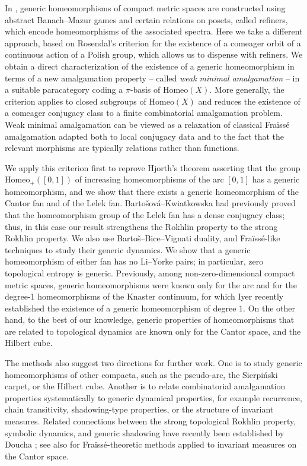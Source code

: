 \documentclass[12pt]{amsart}
\numberwithin{equation}{section}
\theoremstyle{plain}
\theoremstyle{definition}
\newcommand \Homeo{ \mbox{Homeo}}
\newcommand \fra{Fra\"{i}ss\'{e}}
\begin{document}
In \cite{BiMa}, generic homeomorphisms of compact metric spaces are constructed using abstract Banach--Mazur games and certain relations on posets, called refiners, which encode homeomorphisms of the associated spectra. Here we take a different approach, based on Rosendal's criterion for the existence of a comeager orbit of a continuous action of a Polish group, which allows us to dispense with refiners. We obtain a direct characterization of the existence of a generic homeomorphism in terms of a new amalgamation property -- called \emph{weak minimal amalgamation} -- in a suitable paracategory coding a $\pi$-basis of $\Homeo(X)$. More generally, the criterion applies to closed subgroups of $\Homeo(X)$ and reduces the existence of a comeager conjugacy class to a finite combinatorial amalgamation problem. Weak minimal amalgamation can be viewed as a relaxation of classical Fra\"iss\'e amalgamation adapted both to local conjugacy data and to the fact that the relevant morphisms are typically relations rather than functions.


We apply this criterion first to reprove Hjorth's theorem \cite{Hj} asserting that the group $\Homeo_+([0,1])$ of increasing homeomorphisms of the arc $[0,1]$ has a generic homeomorphism, and we show that there exists a generic homeomorphism of the Cantor fan and of the Lelek fan. Barto\v{s}ov\'a--Kwiatkowska \cite{BaKw} had previously proved that the homeomorphism group of the Lelek fan has a dense conjugacy class; thus, in this case our result strengthens the Rokhlin property to the
strong Rokhlin property. We also use Barto\v{s}--Bice--Vignati duality, and Fra\"iss\'e-like techniques to study their generic dynamics.  We show that a generic homeomorphism of either fan has no Li--Yorke pairs; in particular, zero topological entropy is generic. Previously, among non-zero-dimensional compact metric spaces, generic homeomorphisms were known only for the arc and for the degree-1 homeomorphisms of the Knaster continuum, for which Iyer \cite{Iy} recently established the existence of a generic homeomorphism of degree $1$. On the other hand, to the best of our knowledge, generic properties of homeomorphisms that are related to topological dynamics are known only for the Cantor space, and the Hilbert cube.  

The methods also suggest two directions for further work. One is to study generic homeomorphisms of other compacta, such as the pseudo-arc, the Sierpiński carpet, or the Hilbert cube. Another is to relate combinatorial amalgamation properties systematically to generic dynamical properties, for example recurrence, chain transitivity, shadowing-type properties, or the structure of invariant measures. Related connections between the strong topological Rokhlin property, symbolic dynamics, and generic shadowing have recently been established by Doucha \cite{Do}; see also \cite{DoKwMaNi} for Fra\"iss\'e-theoretic methods applied to invariant measures on the Cantor space. %
\end{document}
